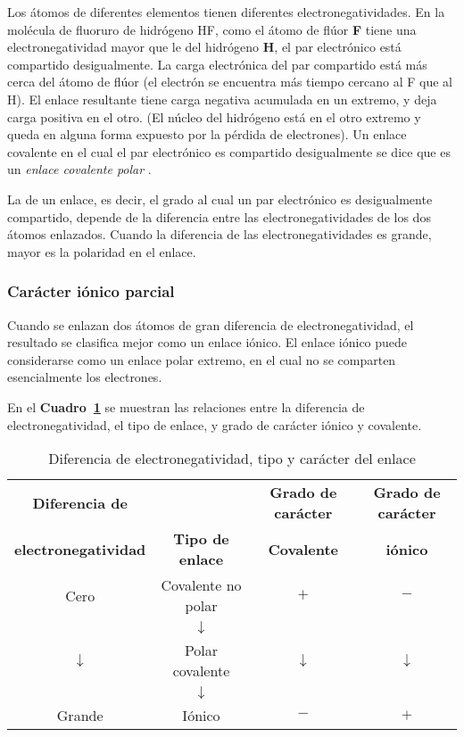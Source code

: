 Los \'atomos de diferentes elementos tienen diferentes electronegatividades. En la
mol\'ecula de fluoruro de hidr\'ogeno HF,  como el \'atomo de fl\'uor \textbf{F} tiene una
electronegatividad mayor que le del hidr\'ogeno \textbf{H}, el par electr\'onico est\'a
compartido desigualmente. La carga electr\'onica del par compartido est\'a m\'as
cerca del \'atomo de fl\'uor (el electr\'on se encuentra m\'as tiempo cercano al F que
al H). El enlace resultante tiene carga negativa acumulada en un extremo, y deja carga
positiva en el otro. (El n\'ucleo del hidr\'ogeno est\'a en el otro extremo y queda
en alguna forma expuesto por la p\'erdida de electrones). Un enlace covalente en el
cual el par electr\'onico es compartido desigualmente se dice que es un
\textit{enlace covalente polar} .

La  de un enlace, es decir, el grado al cual un par electr\'onico es desigualmente compartido, depende de la diferencia entre las
electrone\-gatividades de los dos \'atomos enlazados. Cuando la diferencia de las elec\-tro\-ne\-gatividades es grande, mayor es la polaridad en el enlace.

\subsubsection{Car\'acter i\'onico parcial}

 Cuando se enlazan dos \'atomos de gran diferencia de electronegatividad, el resultado se clasifica mejor como un enlace i\'onico. El enlace i\'onico puede considerarse como un enlace polar extremo, en el cual no se comparten esencialmente los electrones.

En el \textbf{Cuadro~\ref{enlace}} se muestran las relaciones entre la diferencia de electronegatividad, el tipo de enlace, y grado de car\'acter i\'onico y covalente.
\begin{table}[thb]
\caption[Electronegatividades y enlaces]{Diferencia de electronegatividad, tipo y
car\'acter del enlace}
\label{enlace}
{\small \begin{tabular}{cccc}\hline
\textbf{Diferencia de}&&\textbf{Grado de car\'acter}&\textbf{Grado de car\'acter}\\
\textbf{electronegatividad}&\textbf{Tipo de enlace}&\textbf{Covalente}& 
\textbf{i\'onico}\\ \hline

Cero &Covalente no polar&$+$ & $-$ \\
   & $\downarrow$ &\\
 $\downarrow$ &Polar covalente&  $\downarrow$ & $\downarrow$ \\
  &  $\downarrow$ & \\
Grande & I\'onico & $-$ & $+$ \\ \hline
\end{tabular}}
\end{table}
